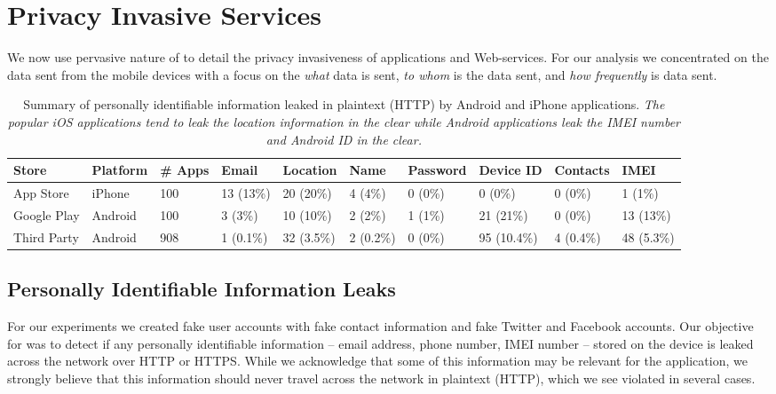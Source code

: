 \section{Privacy Invasive Services}
\label{sec:characterize-app}

We now use pervasive nature of \platname to detail  the privacy invasiveness of applications and Web-services. 
For our analysis we concentrated on the data sent from the mobile devices with a focus on the {\it what} data is sent,  {\it to whom} is the data sent, and {\it how frequently} is data sent.

\begin{table}[t]    
    \centering
    \begin{small}
    \begin{tabular}{|l|l|l|l|l|l|l|l|l|l|}
       \hline
       {\bf Store}&{\bf Platform}&{\bf \# Apps}&{\bf Email}& {\bf Location}& {\bf Name} &{\bf Password}& {\bf Device ID}& {\bf Contacts}& {\bf IMEI}\\
       \hline
       App Store&iPhone&100&13 (13\%) &20 (20\%)&4 (4\%)&0 (0\%)&0 (0\%)&0 (0\%)&1 (1\%)\\
       \hline
       Google Play&Android&100&3 (3\%)&10 (10\%)&2 (2\%)&1 (1\%)&21 (21\%)&0 (0\%)&13 (13\%)\\
       \hline
       Third Party&Android&908&1 (0.1\%)&32 (3.5\%)&2 (0.2\%)&0 (0\%)&95 (10.4\%)&4 (0.4\%)&48 (5.3\%)\\
       \hline
    \end{tabular}
    \end{small}
    \caption{Summary of personally identifiable information leaked in plaintext (HTTP) by Android and iPhone applications. \emph{The popular iOS applications tend to leak the location information in the clear while Android applications leak the IMEI number and Android ID in the clear.}}
    \label{tab:pii}
\end{table}

\subsection{Personally Identifiable Information Leaks}

For our experiments we created fake user accounts with fake contact information and fake Twitter and Facebook accounts.  
Our objective for was to detect if any personally identifiable information -- email address, phone number, IMEI number -- stored on the device is leaked across the network over HTTP or HTTPS.
While we acknowledge that some of this information may be relevant for the application, we strongly believe that this information should never travel across the network in plaintext (HTTP), which we see violated in several cases.


